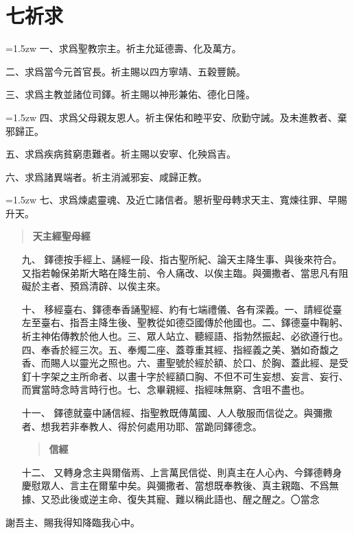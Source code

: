 \section*{七祈求}
\hangindent=1.5zw 一、求爲聖教宗主。祈主允延德壽、化及萬方。

二、求爲當今元首官長。祈主賜以四方寧靖、五穀豐饒。

三、求爲主教並諸位司鐸。祈主賜以神形兼佑、德化日隆。

\hangindent=1.5zw 四、求爲父母親友恩人。祈主保佑和睦平安、欣勤守誡。及未進教者、棄邪歸正。

五、求爲疾病貧窮患難者。祈主賜以安寧、化殃爲吉。

六、求爲諸異端者。祈主消滅邪妄、咸歸正教。

\hangindent=1.5zw 七、求爲煉處靈魂、及近亡諸信者。懇祈聖母轉求天主、寬煉往罪、早賜升天。

\begin{quote}
\bfseries 天主經\quad 聖母經
\end{quote}

\begin{enumerate}
    \item[九、]{\small }鐸德按手經上、誦經一段、指古聖所紀、論天主降生事、與後來符合。又指若翰保弟斯大略在降生前、令人痛改、以俟主臨。與彌撒者、當思凡有阻礙於主者、預爲清辟、以俟主來。
    \item[十、]{\small 移經臺右、鐸德奉香誦聖經、約有七端禮儀、各有深義。一、請經從臺左至臺右、指吾主降生後、聖教從如德亞國傳於他國也。二、鐸德臺中鞠躬、祈主神佑傳教於他人也。三、眾人站立、聽經語、指勃然振起、必欲遵行也。四、奉香於經三次。五、奉燭二座、蓋尊重其經、指經義之美、猶如奇馥之香、而賜人以靈光之照也。六、畫聖號於經於額、於口、於胸、蓋此經、是受釘十字架之主所命者、以畫十字於經額口胸、不但不可生妄想、妄言、妄行、而實當時念時言時行也。七、念畢親經、指經味無窮、含咀不盡也。} 
    \item[十一、]{\small 鐸德就臺中誦信經、指聖教既傳萬國、人人敬服而信從之。與彌撒者、想我若非奉教人、得於何處用功耶、當跪同鐸德念。}
    \begin{quote}
        \bfseries 信經
    \end{quote}
    \item[十二、]{\small 又轉身念主與爾偕焉、上言萬民信從、則真主在人心內、今鐸德轉身慶慰眾人、言主在爾輩中矣。與彌撒者、當想既奉教後、真主親臨、不爲無據、又恐此後或逆主命、復失其寵、難以稱此語也、醒之醒之。〇當念}
\end{enumerate} 
謝吾主、賜我得知降臨我心中。

